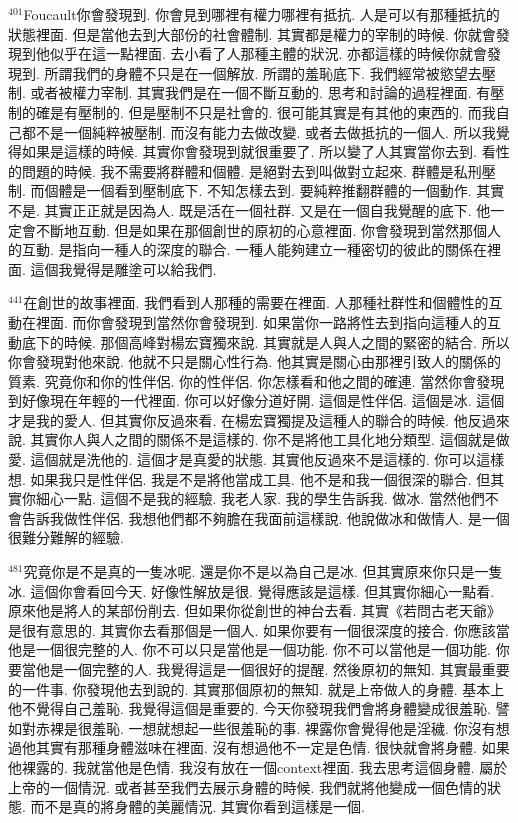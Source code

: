 \documentclass{book}
\begin{document}
$^{401}$Foucault你會發現到.
你會見到哪裡有權力哪裡有抵抗.
人是可以有那種抵抗的狀態裡面.
但是當他去到大部份的社會體制.
其實都是權力的宰制的時候.
你就會發現到他似乎在這一點裡面.
去小看了人那種主體的狀況.
亦都這樣的時候你就會發現到.
所謂我們的身體不只是在一個解放.
所謂的羞恥底下.
我們經常被慾望去壓制.
或者被權力宰制.
其實我們是在一個不斷互動的.
思考和討論的過程裡面.
有壓制的確是有壓制的.
但是壓制不只是社會的.
很可能其實是有其他的東西的.
而我自己都不是一個純粹被壓制.
而沒有能力去做改變.
或者去做抵抗的一個人.
所以我覺得如果是這樣的時候.
其實你會發現到就很重要了.
所以變了人其實當你去到.
看性的問題的時候.
我不需要將群體和個體.
是絕對去到叫做對立起來.
群體是私刑壓制.
而個體是一個看到壓制底下.
不知怎樣去到.
要純粹推翻群體的一個動作.
其實不是.
其實正正就是因為人.
既是活在一個社群.
又是在一個自我覺醒的底下.
他一定會不斷地互動.
但是如果在那個創世的原初的心意裡面.
你會發現到當然那個人的互動.
是指向一種人的深度的聯合.
一種人能夠建立一種密切的彼此的關係在裡面.
這個我覺得是雕塗可以給我們.

$^{441}$在創世的故事裡面.
我們看到人那種的需要在裡面.
人那種社群性和個體性的互動在裡面.
而你會發現到當然你會發現到.
如果當你一路將性去到指向這種人的互動底下的時候.
那個高峰對楊宏寶獨來說.
其實就是人與人之間的緊密的結合.
所以你會發現對他來說.
他就不只是關心性行為.
他其實是關心由那裡引致人的關係的質素.
究竟你和你的性伴侶.
你的性伴侶.
你怎樣看和他之間的確連.
當然你會發現到好像現在年輕的一代裡面.
你可以好像分道好開.
這個是性伴侶.
這個是冰.
這個才是我的愛人.
但其實你反過來看.
在楊宏寶獨提及這種人的聯合的時候.
他反過來說.
其實你人與人之間的關係不是這樣的.
你不是將他工具化地分類型.
這個就是做愛.
這個就是洗他的.
這個才是真愛的狀態.
其實他反過來不是這樣的.
你可以這樣想.
如果我只是性伴侶.
我是不是將他當成工具.
他不是和我一個很深的聯合.
但其實你細心一點.
這個不是我的經驗.
我老人家.
我的學生告訴我.
做冰.
當然他們不會告訴我做性伴侶.
我想他們都不夠膽在我面前這樣說.
他說做冰和做情人.
是一個很難分難解的經驗.

$^{481}$究竟你是不是真的一隻冰呢.
還是你不是以為自己是冰.
但其實原來你只是一隻冰.
這個你會看回今天.
好像性解放是很.
覺得應該是這樣.
但其實你細心一點看.
原來他是將人的某部份削去.
但如果你從創世的神台去看.
其實《若問古老天爺》是很有意思的.
其實你去看那個是一個人.
如果你要有一個很深度的接合.
你應該當他是一個很完整的人.
你不可以只是當他是一個功能.
你不可以當他是一個功能.
你要當他是一個完整的人.
我覺得這是一個很好的提醒.
然後原初的無知.
其實最重要的一件事.
你發現他去到說的.
其實那個原初的無知.
就是上帝做人的身體.
基本上他不覺得自己羞恥.
我覺得這個是重要的.
今天你發現我們會將身體變成很羞恥.
譬如對赤裸是很羞恥.
一想就想起一些很羞恥的事.
裸露你會覺得他是淫穢.
你沒有想過他其實有那種身體滋味在裡面.
沒有想過他不一定是色情.
很快就會將身體.
如果他裸露的.
我就當他是色情.
我沒有放在一個context裡面.
我去思考這個身體.
屬於上帝的一個情況.
或者甚至我們去展示身體的時候.
我們就將他變成一個色情的狀態.
而不是真的將身體的美麗情況.
其實你看到這樣是一個.
\end{document}
